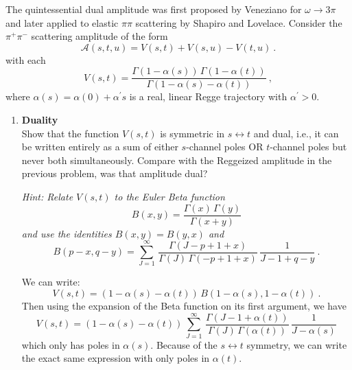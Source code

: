The quintessential dual amplitude was first proposed by Veneziano for $\omega\to3\pi$ and later applied to elastic $\pi\pi$ scattering by Shapiro and Lovelace. Consider the $\pi^+\pi^-$ scattering amplitude of the form
\begin{equation}
    \label{eq:Astu}
    \mathcal{A}(s,t,u) = V(s,t) + V(s,u) - V(t,u) ~.
\end{equation}
with each
\begin{equation}
    \label{eq:Fst}
    V(s,t) = \frac{\Gamma(1-\alpha(s)) \, \Gamma(1-\alpha(t))}{\Gamma(1-\alpha(s) - \alpha(t))} ~,
\end{equation}
where $\alpha(s) = \alpha(0) + \alpha^\prime s$ is a real, linear Regge trajectory with $\alpha^\prime > 0$.

\begin{enumerate}
    \item \textbf{Duality} \\
          Show that the function $V(s,t)$ is symmetric in $s\leftrightarrow t$ and dual, i.e., it can be written entirely as a sum of either $s$-channel poles OR $t$-channel poles but never both simultaneously. Compare with the Reggeized amplitude in the previous problem, was that amplitude dual?

          \noindent \textit{Hint: Relate $V(s,t)$ to the Euler Beta function
              \begin{equation}
                  B(x,y) = \frac{\Gamma(x) \, \Gamma(y)}{\Gamma(x+y)}
              \end{equation}
              and use the identities $B(x,y) = B(y,x)$ and
              \begin{equation}
                  B(p-x, q-y) = \sum_{J=1}^\infty \, \frac{\Gamma(J-p+1 +x)}{\Gamma(J) \, \Gamma(-p + 1 +x)} \, \frac{1}{J-1+q-y} ~.
              \end{equation}
          }

          \begin{solution}
              We can write:
              \begin{equation}
                  V(s,t) = (1-\alpha(s) - \alpha(t)) \, B(1-\alpha(s), 1-\alpha(t)) ~.
              \end{equation}
              Then using the expansion of the Beta function on its first argument, we have
              \begin{equation}
                  V(s,t) = (1-\alpha(s) - \alpha(t)) \, \sum_{J=1}^\infty \, \frac{\Gamma(J-1+\alpha(t))}{\Gamma(J) \, \Gamma(\alpha(t))} \, \frac{1}{J-\alpha(s)}
              \end{equation}
              which only has poles in $\alpha(s)$. Because of the $s\leftrightarrow t$ symmetry, we can write the exact same expression with only poles in $\alpha(t)$.
          \end{solution}


\end{enumerate}
